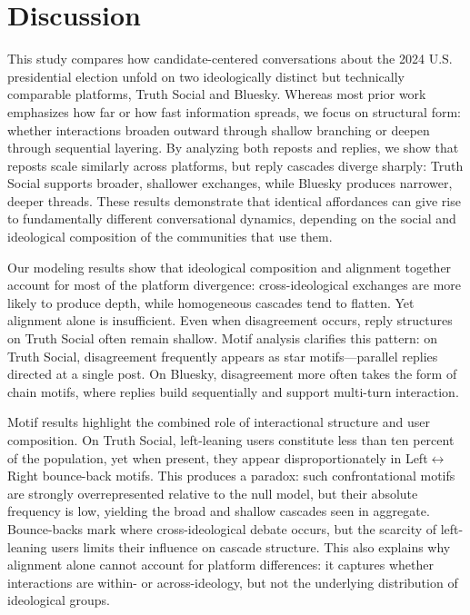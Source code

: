 \documentclass[letterpaper]{article} %
\begin{document}
\section{Discussion}
This study compares how candidate-centered conversations about the 2024 U.S. presidential election unfold on two ideologically distinct but technically comparable platforms, Truth Social and Bluesky. Whereas most prior work emphasizes how far or how fast information spreads, we focus on structural form: whether interactions broaden outward through shallow branching or deepen through sequential layering. By analyzing both reposts and replies, we show that reposts scale similarly across platforms, but reply cascades diverge sharply: Truth Social supports broader, shallower exchanges, while Bluesky produces narrower, deeper threads. These results demonstrate that identical affordances can give rise to fundamentally different conversational dynamics, depending on the social and ideological composition of the communities that use them.

Our modeling results show that ideological composition and alignment together account for most of the platform divergence: cross-ideological exchanges are more likely to produce depth, while homogeneous cascades tend to flatten. Yet alignment alone is insufficient. Even when disagreement occurs, reply structures on Truth Social often remain shallow. 
Motif analysis clarifies this pattern: on Truth Social, disagreement frequently appears as star motifs---parallel replies directed at a single post. On Bluesky, disagreement more often takes the form of chain motifs, where replies build sequentially and support multi-turn interaction.

Motif results highlight the combined role of interactional structure and user composition. On Truth Social, left-leaning users constitute less than ten percent of the population, yet when present, they appear disproportionately in Left$\leftrightarrow$Right bounce-back motifs. This produces a paradox: such confrontational motifs are strongly overrepresented relative to the null model, but their absolute frequency is low, yielding the broad and shallow cascades seen in aggregate. Bounce-backs mark where cross-ideological debate occurs, but the scarcity of left-leaning users limits their influence on cascade structure. This also explains why alignment alone cannot account for platform differences: it captures whether interactions are within- or across-ideology, but not the underlying distribution of ideological groups.
\end{document}
